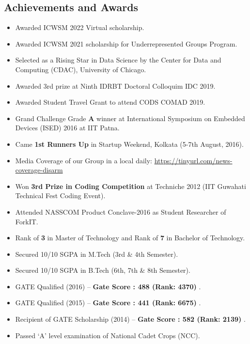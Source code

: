 \documentclass[margin, centered]{res}
\begin{document}
\begin{resume}
\section{Achievements and Awards}
\begin{itemize}[leftmargin=*]
 \item Awarded ICWSM 2022 Virtual scholarship.
 \item Awarded ICWSM 2021 scholarship for Underrepresented Groups Program.
 \item Selected as a Rising Star in Data Science by the Center for Data and Computing (CDAC), University of Chicago.
 \item Awarded 3rd prize at Ninth IDRBT Doctoral Colloquim IDC 2019.
 \item Awarded Student Travel Grant to attend CODS COMAD 2019.
 \item Grand Challenge Grade \textbf{A} winner at International Symposium on Embedded Devices (ISED) 2016 at IIT Patna.
 \item Came \textbf{1st Runners Up} in Startup Weekend, Kolkata (5-7th August, 2016).
 \item Media Coverage of our Group in a local daily: \url{https://tinyurl.com/news-coverage-disarm}
 \item Won \textbf{3rd Prize in Coding Competition} at Techniche 2012 (IIT Guwahati Technical Fest Coding Event).
 \item Attended NASSCOM Product Conclave-2016 as Student Researcher of ForkIT.
 \item Rank of \textbf{3} in Master of Technology and Rank of \textbf{7} in Bachelor of Technology.
 \item Secured 10/10 SGPA in M.Tech (3rd \& 4th Semester).
 \item Secured 10/10 SGPA in B.Tech (6th, 7th \& 8th Semester).
 \item GATE Qualified (2016) – \textbf{Gate Score : 488 (Rank: 4370) }.
 \item GATE Qualified (2015) – \textbf{Gate Score : 441 (Rank: 6675) }.
 \item Recipient of GATE Scholarship (2014) – \textbf{Gate Score : 582 (Rank: 2139) }.

 \item Passed `A' level examination of National Cadet Crops (NCC).
\end{itemize}


\end{resume}
\end{document}
